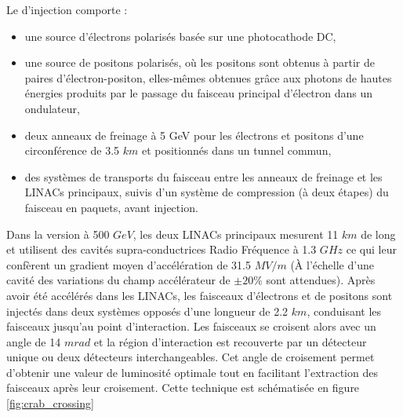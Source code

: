   Le d'injection comporte :
  
  \medskip
  
  \renewcommand{\labelitemi}{$\bullet$}
  
  \begin{itemize}
   
   \item une source d'\'electrons polaris\'es bas\'ee sur une photocathode DC,
   
   \item une source de positons polaris\'es, o\`u les positons sont obtenus \`a partir de paires d'\'electron-positon, elles-m\^emes obtenues gr\^ace aux photons de hautes \'energies produits par le passage du faisceau principal d'\'electron dans un ondulateur,
   
   \item deux anneaux de freinage \`a 5 GeV pour les \'electrons et positons d'une circonf\'erence de 3.5 $km$ et positionn\'es dans un tunnel commun,
   
   \item des syst\`emes de transports du faisceau entre les anneaux de freinage et les LINACs principaux, suivis d'un syst\`eme de compression (\`a deux \'etapes) du faisceau en paquets, avant injection.
   
   \end{itemize}
  
  \medskip
  
  Dans la version \`a 500 $GeV$, les deux LINACs principaux mesurent 11 $km$ de long et utilisent des cavit\'es supra-conductrices Radio Fr\'equence \`a 1.3 $GHz$ ce qui leur conf\`erent un gradient moyen d'acc\'el\'eration de 31.5 $MV/m$ (\`A l'\'echelle d'une cavit\'e des variations du champ acc\'el\'erateur de $\pm 20 \%$ sont attendues). Apr\`es avoir \'et\'e acc\'el\'er\'es dans les LINACs, les faisceaux d'\'electrons et de positons sont inject\'es dans deux syst\`emes oppos\'es d'une longueur de 2.2 $km$, conduisant les faisceaux jusqu'au point d'interaction. Les faisceaux se croisent alors avec un angle de 14 $mrad$ et la r\'egion d'interaction est recouverte par un d\'etecteur unique ou deux d\'etecteurs interchangeables. Cet angle de croisement permet d'obtenir une valeur de luminosit\'e optimale tout en facilitant l'extraction des faisceaux apr\`es leur croisement. Cette technique est sch\'ematis\'ee en figure \ref{fig:crab_crossing}
  
